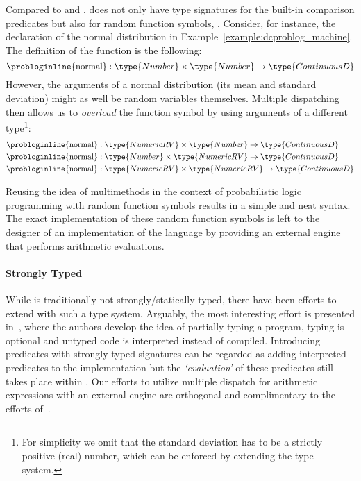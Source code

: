 Compared to \problogsty and \problogsty, \dcproblogsty does not only have type signatures for the built-in comparison predicates but also for random function symbols, \eg {}.
Consider, for instance, the declaration of the normal distribution in Example~\ref{example:dcproblog_machine}.
The definition of the function is the following:
$$ \text{\probloginline{normal}}: \type{Number} \times \type{Number} \rightarrow \type{ContinuousD}$$
However, the arguments of a normal distribution (its mean and standard deviation) might as well be random variables themselves.
Multiple dispatching then allows us to {\em overload} the  function symbol by using arguments of a different type\footnote{For simplicity we omit that the standard deviation has to be a strictly positive (real) number, which can be enforced by extending the type system.}:
\begin{align*}
	\text{\probloginline{normal}}&: \type{NumericRV} \times \type{Number} \rightarrow \type{ContinuousD} \\
	\text{\probloginline{normal}}&: \type{Number} \times \type{NumericRV} \rightarrow \type{ContinuousD} \\
	\text{\probloginline{normal}}&: \type{NumericRV} \times \type{NumericRV} \rightarrow \type{ContinuousD}
\end{align*}

Reusing the idea of multimethods in the context of probabilistic logic programming with random function symbols results in a simple and neat syntax.
The exact implementation of these random function symbols is left to the designer of an implementation of the language by providing an external engine that performs arithmetic evaluations.




\paragraph{Strongly Typed \prologsty}

While \prologsty is traditionally not strongly/statically typed, there have been efforts to extend \prologsty with such a type system. Arguably, the most interesting effort is presented in~\citep{Schrijvers2008TowardsTP}, where the authors develop the idea of partially typing a \prologsty program, \ie typing is optional and untyped code is interpreted instead of compiled. Introducing predicates with strongly typed signatures can be regarded as adding interpreted predicates to the \prologsty implementation but the {\em `evaluation'} of these predicates still takes place within \prologsty.
Our efforts to utilize multiple dispatch for arithmetic expressions with an external engine are orthogonal and complimentary to the efforts of~\citet{Schrijvers2008TowardsTP}.

